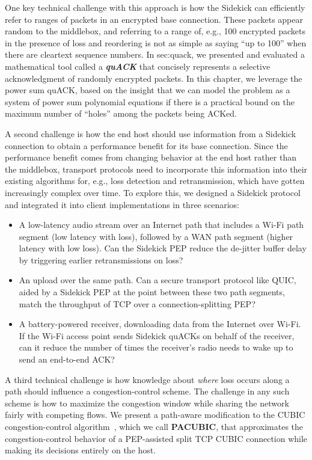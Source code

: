 One key technical challenge with this approach is how the Sidekick can
efficiently refer to ranges of packets in an encrypted base connection. These
packets appear random to the middlebox, and referring to a range of, e.g., 100
encrypted packets in the presence of loss and reordering is not as simple as
saying ``up to 100'' when there are cleartext sequence numbers. In \Cref
{sec:quack}, we presented and evaluated a mathematical tool called a \emph
{\bf quACK} that concisely represents a selective acknowledgment of randomly
encrypted packets. In this chapter, we leverage the power sum quACK,
based on the insight that we can model the problem as a system of power
sum polynomial equations if there is a practical bound on the maximum number of
``holes'' among the packets being ACKed.

A second challenge is how the end host should use information from a Sidekick
connection to obtain a performance benefit for its base connection. Since the
performance benefit comes from changing behavior at the end host rather than
the middlebox, transport protocols need to incorporate this information into
their existing algorithms for, e.g., loss detection and retransmission, which
have gotten increasingly complex over time. To explore this, we designed a
Sidekick protocol and integrated it into client implementations in three scenarios:
\begin{itemize}[noitemsep,topsep=2pt]
\item A low-latency audio stream over an Internet path that includes a Wi-Fi
  path segment (low latency with loss), followed by a WAN path segment (higher
  latency with low loss). Can the Sidekick PEP reduce the de-jitter buffer delay
  by triggering earlier retransmissions on loss?

\item An upload over the same path. Can a secure transport protocol like QUIC,
  aided by a Sidekick PEP at the point between these two path segments, match
  the throughput of TCP over a connection-splitting PEP?

\item A battery-powered receiver, downloading data from the Internet over Wi-Fi.
  If the Wi-Fi access point sends Sidekick quACKs on behalf of the receiver,
  can it reduce the number of times the receiver's radio needs to wake up
  to send an end-to-end ACK?
\end{itemize}

\smallskip

A third technical challenge is how knowledge about \emph{where}
loss occurs along a path should influence a congestion-control scheme.
The challenge in any such scheme is how to maximize the congestion window
while sharing the network fairly with competing flows.
We present a path-aware modification to the CUBIC congestion-control
algorithm~\cite{ha2008cubic}, which we call \mbox{\textbf{PACUBIC}},
that approximates the congestion-control behavior of a PEP-assisted split TCP
CUBIC connection while making its decisions entirely on the host.

